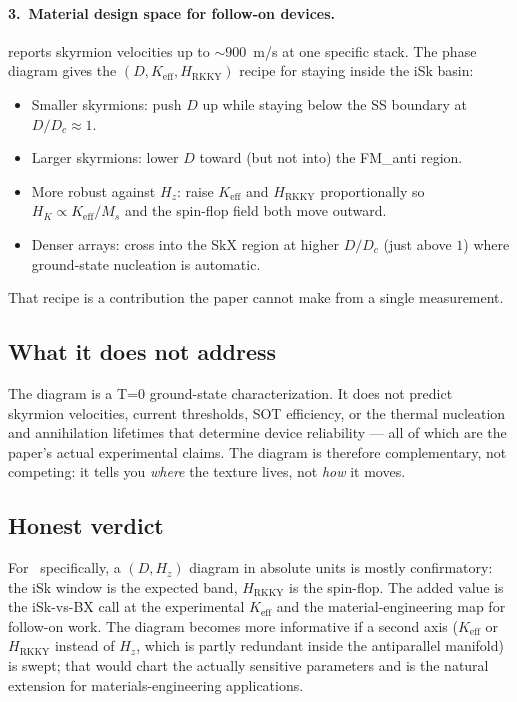 \documentclass[11pt,a4paper]{article}
\newcommand{\Keff}{K_{\text{eff}}}
\newcommand{\Ms}{M_s}
\newcommand{\HK}{H_K}
\newcommand{\Dc}{D_c}
\newcommand{\HRKKY}{H_{\text{RKKY}}}
\begin{document}
\paragraph{3.\ Material design space for follow-on
devices.}
\cite{pham2024} reports skyrmion velocities up to
$\sim 900$~m/s at one specific stack. The phase diagram
gives the $(D, \Keff, \HRKKY)$ recipe for staying inside
the iSk basin:
%
\begin{itemize}[nosep]
\item Smaller skyrmions: push $D$ up while staying below
    the SS boundary at $D/\Dc \approx 1$.
\item Larger skyrmions: lower $D$ toward (but not into)
    the FM\_anti region.
\item More robust against $H_z$: raise $\Keff$ and
    $\HRKKY$ proportionally so $\HK \propto \Keff/\Ms$
    and the spin-flop field both move outward.
\item Denser arrays: cross into the SkX region at higher
    $D/\Dc$ (just above $1$) where ground-state
    nucleation is automatic.
\end{itemize}
%
That recipe is a contribution the paper cannot make from a
single measurement.

\subsection{What it does not address}

The diagram is a T=0 ground-state characterization. It
does not predict skyrmion velocities, current thresholds,
SOT efficiency, or the thermal nucleation and annihilation
lifetimes that determine device reliability --- all of
which are the paper's actual experimental claims. The
diagram is therefore complementary, not competing: it
tells you \emph{where} the texture lives, not \emph{how}
it moves.

\subsection{Honest verdict}

For~\cite{pham2024} specifically, a $(D, H_z)$ diagram in
absolute units is mostly confirmatory: the iSk window is
the expected band, $\HRKKY$ is the spin-flop. The added
value is the iSk-vs-BX call at the experimental
$\Keff$ and the material-engineering map for follow-on
work. The diagram becomes more informative if a second
axis ($\Keff$ or $\HRKKY$ instead of $H_z$, which is
partly redundant inside the antiparallel manifold) is
swept; that would chart the actually sensitive parameters
and is the natural extension for materials-engineering
applications.
\end{document}
